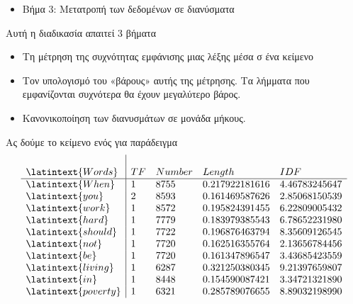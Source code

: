\documentclass{beamer}
\begin{document}
\begin{frame}
\begin{itemize}
\item Βήμα 3: Μετατροπή των δεδομένων σε διανύσματα
\end{itemize}
\vfill
\item Αυτή η διαδικασία απαιτεί 3 βήματα
\vfill
\begin{itemize}
\item Τη μέτρηση της συχνότητας εμφάνισης μιας λέξης μέσα σ ένα κείμενο
\item Τον υπολογισμό του «βάρους» αυτής της μέτρησης. Τα λήμματα που εμφανίζονται συχνότερα θα έχουν μεγαλύτερο βάρος.
\item Κανονικοποίηση των διανυσμάτων σε μονάδα μήκους.
\end{itemize}
\vfill
\end{frame}

\begin{frame}
Ας δούμε το κείμενο ενός {} για παράδειγμα\\
{\emph{{}}}
\[
\left. {\begin{array}{l|llll}\\
{\latintext{Words}} & TF & Number & Length & IDF \\
\hline
{\latintext{When}} & 1 & 8755 & 0.217922181616 & 4.46783245647  \\
{\latintext{you}} & 2 & 8593 & 0.161469587626 & 2.85068150539 \\
{\latintext{work}} & 1 & 8572 & 0.195824391455 & 6.22809005432 \\
{\latintext{hard}} & 1 & 7779 & 0.183979385543 & 6.78652231980 \\
{\latintext{should}} & 1 & 7722 & 0.196876463794 & 8.35609126545 \\
{\latintext{not}} & 1 & 7720 & 0.162516355764 & 2.13656784456 \\
{\latintext{be}} & 1 & 7720 & 0.161347896547 & 3.43685423559 \\
{\latintext{living}} & 1 & 6287 & 0.321250380345 & 9.21397659807 \\
{\latintext{in}} & 1 & 8448 & 0.154590087421 & 3.34721321890 \\
{\latintext{poverty}} & 1 & 6321 & 0.285789076655 & 8.89032198990
\end{array} } \right.
\]

\end{frame}
\end{document}
